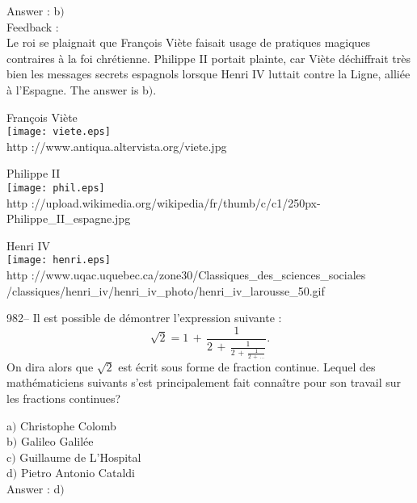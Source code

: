 ﻿\documentclass[letterpaper, 12pt]{article}
\begin{document}
Answer : b$)$\\

Feedback : \\
Le roi se plaignait que Fran\c cois Vi\`ete faisait usage de
pratiques magiques contraires \`a la foi chr\'etienne. Philippe II
portait plainte, car Vi\`ete d\'echiffrait tr\`es bien les messages
secrets espagnols lorsque Henri IV luttait contre la Ligne, alli\'ee
\`a l'Espagne.
The answer is b$)$.\\

        \begin{center}
        Fran\c cois Vi\`ete\\
    \texttt{[image: viete.eps]}\\
        {\footnotesize http ://www.antiqua.altervista.org/viete.jpg}
    \end{center}

        \begin{center}
        Philippe II\\
    \texttt{[image: phil.eps]}\\
        {\footnotesize http
://upload.wikimedia.org/wikipedia/fr/thumb/c/c1/250px-Philippe\_II\_espagne.jpg}
    \end{center}

        \begin{center}
        Henri IV\\
    \texttt{[image: henri.eps]}\\
        {\footnotesize http
://www.uqac.uquebec.ca/zone30/Classiques\_des\_sciences\_sociales\\
        /classiques/henri\_iv/henri\_iv\_photo/henri\_iv\_larousse\_50.gif}
    \end{center}

982-- Il est possible de d\'emontrer l'expression suivante :
$$\sqrt2=1\,+\,\frac1{2\,+\,\frac1{2\,+\,\frac1{2\,+\,\ldots}}}.$$
On dira alors que $\sqrt2$ est \'ecrit sous forme de fraction
continue. Lequel des math\'ematiciens suivants s'est principalement
fait conna\^itre pour son travail sur les fractions continues?

a$)$ Christophe Colomb \\
b$)$ Galileo Galil\'ee \\
c$)$ Guillaume de L'Hospital \\
d$)$ Pietro Antonio Cataldi\\

Answer : d$)$\\
\end{document}
